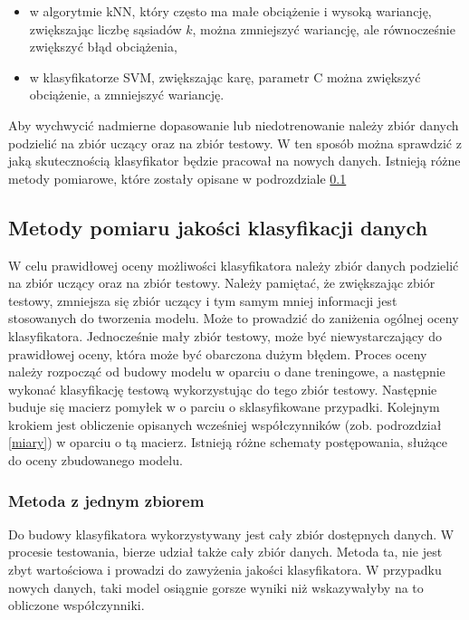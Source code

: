\begin{itemize}
	\item w algorytmie kNN, który często ma małe obciążenie i wysoką wariancję, zwiększając liczbę sąsiadów $k$, można zmniejszyć wariancję, ale równocześnie zwiększyć błąd obciążenia,
	\item w klasyfikatorze SVM, zwiększając karę, parametr C można zwiększyć obciążenie, a zmniejszyć wariancję.
\end{itemize}
Aby wychwycić nadmierne dopasowanie lub niedotrenowanie należy zbiór danych podzielić na zbiór uczący oraz na zbiór testowy. W ten sposób można sprawdzić z jaką skutecznością klasyfikator będzie pracował na nowych danych. Istnieją różne metody pomiarowe, które zostały opisane w podrozdziale \ref{testowanieklasyfikatora}
\subsection{Metody pomiaru jakości klasyfikacji danych} \label {testowanieklasyfikatora}
W celu prawidłowej oceny możliwości klasyfikatora należy zbiór danych podzielić na zbiór uczący oraz na zbiór testowy. Należy pamiętać, że zwiększając zbiór testowy, zmniejsza się zbiór uczący i tym samym mniej informacji jest stosowanych do tworzenia modelu. Może to prowadzić do zaniżenia ogólnej oceny klasyfikatora. Jednocześnie mały zbiór testowy, może być niewystarczający do prawidłowej oceny, która może być obarczona dużym błędem. Proces oceny należy rozpocząć od budowy modelu w oparciu o dane treningowe, a następnie wykonać klasyfikację testową wykorzystując do tego zbiór testowy. Następnie buduje się macierz pomyłek w o parciu o sklasyfikowane przypadki. Kolejnym krokiem jest obliczenie opisanych wcześniej współczynników (zob. podrozdział \ref*{miary}) w oparciu o tą macierz. Istnieją różne schematy postępowania, służące do oceny zbudowanego modelu.

\subsubsection{Metoda z jednym zbiorem}
Do budowy klasyfikatora wykorzystywany jest cały zbiór dostępnych danych. W procesie testowania, bierze udział także cały zbiór danych. Metoda ta, nie jest zbyt wartościowa i prowadzi do zawyżenia jakości klasyfikatora. W przypadku nowych danych, taki model osiągnie gorsze wyniki niż wskazywałyby na to obliczone współczynniki.

